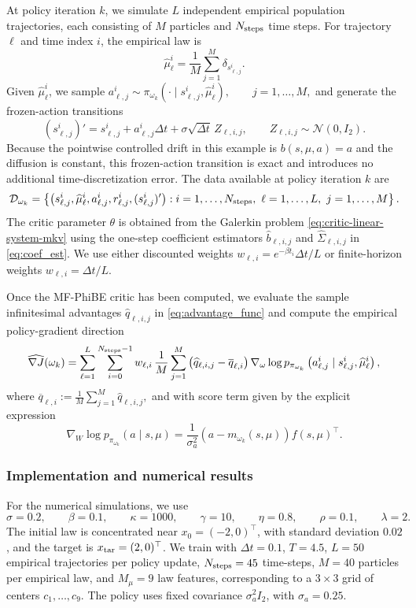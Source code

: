 \documentclass[a4paper, 10pt, english, reqno]{amsart}
\begin{document}
At policy iteration $k$, we simulate $L$ independent empirical population trajectories, each consisting of $M$ particles and $N_{\rm steps}$ time steps. For trajectory $\ell$ and time index $i$, the empirical law is
\[
\widehat\mu_\ell^i
=
\frac{1}{M}\sum_{j=1}^M \delta_{s_{\ell,j}^i}.
\]
Given $\widehat\mu_\ell^i$, we sample $a_{\ell,j}^i
\sim
\pi_{\omega_k}(\cdot\mid s_{\ell,j}^i,\widehat\mu_\ell^i),
\qquad j=1,\ldots,M,$ and generate the frozen-action transitions
\[
(s_{\ell,j}^i)'
=
s_{\ell,j}^i+a_{\ell,j}^i\Delta t
+\sigma\sqrt{\Delta t}\,Z_{\ell,i,j},
\qquad
Z_{\ell,i,j}\sim\mathcal N(0,I_2).
\]
Because the pointwise controlled drift in this example is
$b(s,\mu,a)=a$ and the diffusion is constant, this frozen-action
transition is exact and introduces no additional time-discretization
error. The data available at policy iteration $k$ are
\[
 \mathcal D_{\omega_k}
  =
  \left\{
  \bigl(
  s_{\ell,j}^i,\widehat\mu_\ell^i,
  a_{\ell,j}^i,r_{\ell,j}^i,(s_{\ell,j}^i)'
  \bigr)
  :
  i=1,\ldots,N_{\rm steps},\ \ell=1,\ldots,L,\ j=1,\ldots,M
  \right\}.
\]
The critic parameter $\theta$ is obtained from the Galerkin problem \eqref{eq:critic-linear-system-mkv} using the one-step coefficient estimators $\widehat b_{\ell,i,j}$ and $\widehat\Sigma_{\ell,i,j}$ in \eqref{eq:coef_est}. We use either discounted weights $w_{\ell,i}=e^{-\beta t_i}\Delta t/L$ or finite-horizon weights $w_{\ell,i}=\Delta t/L$.

Once the MF-PhiBE critic has been computed, we evaluate the sample infinitesimal advantages $\widehat q_{\ell,i,j}$ in \eqref{eq:advantage_func} and compute the empirical policy-gradient direction
\[
\widehat{\nabla J}(\omega_k)
=
\sum_{\ell=1}^{L}
\sum_{i=0}^{N_{\rm steps}-1}
w_{\ell,i}\,
\frac1M\sum_{j=1}^{M}
\left(
\widehat q_{\ell,i,j}
-
\overline q_{\ell,i}
\right)
\nabla_\omega
\log p_{\pi_{\omega_k}}
\left(
a_{\ell,j}^i
\mid
s_{\ell,j}^i,\widehat\mu_\ell^i
\right),
\]
where $\overline q_{\ell,i}
:=
\frac1M\sum_{j=1}^{M}\widehat q_{\ell,i,j},$ and with score term given by the explicit expression
\[
\nabla_W\log p_{\pi_{\omega_k}}(a\mid s,\mu)
=
\frac{1}{\sigma_a^2}
\left(a-m_{\omega_k}(s,\mu)\right)f(s,\mu)^\top.
\]

\subsubsection{Implementation and numerical results}

For the numerical simulations, we use
\[
\sigma=0.2,
\qquad
\beta=0.1,
\qquad
\kappa=1000,
\qquad
\gamma=10,
\qquad
\eta=0.8,
\qquad
\rho=0.1,
\qquad
\lambda=2.
\]
The initial law is concentrated near $x_0=(-2,0)^\top$, with standard deviation $0.02$, and the target is $x_{\rm tar}=(2,0)^\top$. We train with $\Delta t=0.1$, $T=4.5$, $L=50$ empirical trajectories per policy update, $N_{\rm steps}=45$ time-steps, $M=40$ particles per empirical law,  and $M_\mu=9$ law features, corresponding to a $3\times 3$ grid of centers $c_1,\ldots,c_9$. The policy uses fixed covariance $\sigma_a^2 I_2$, with $\sigma_a=0.25$.
\end{document}
